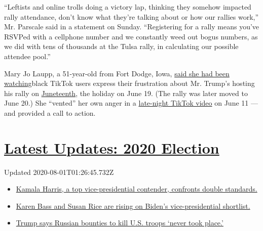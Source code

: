 ``Leftists and online trolls doing a victory lap, thinking they somehow
impacted rally attendance, don't know what they're talking about or how
our rallies work,'' Mr. Parscale said in a statement on Sunday.
``Registering for a rally means you've RSVPed with a cellphone number
and we constantly weed out bogus numbers, as we did with tens of
thousands at the Tulsa rally, in calculating our possible attendee
pool.''

Mary Jo Laupp, a 51-year-old from Fort Dodge, Iowa,
\href{https://www.dailydot.com/debug/tiktok-challenge-trump-rally/}{said
she had been watching}black TikTok users express their frustration about
Mr. Trump's hosting his rally on
\href{https://www.nytimes3xbfgragh.onion/interactive/2020/06/18/style/juneteenth-celebration.html}{Juneteenth},
the holiday on June 19. (The rally was later moved to June 20.) She
``vented'' her own anger in a
\href{https://www.tiktok.com/@maryjolaupp/video/6837311838640803078}{late-night
TikTok video} on June 11 --- and provided a call to action.

\hypertarget{latest-updates-2020-election}{%
\section{\texorpdfstring{\href{https://www.nytimes3xbfgragh.onion/2020/07/31/us/elections/biden-vs-trump.html?action=click\&pgtype=Article\&state=default\&region=MAIN_CONTENT_1\&context=storylines_live_updates}{Latest
Updates: 2020
Election}}{Latest Updates: 2020 Election}}\label{latest-updates-2020-election}}

Updated 2020-08-01T01:26:45.732Z

\begin{itemize}
\tightlist
\item
  \href{https://www.nytimes3xbfgragh.onion/2020/07/31/us/elections/biden-vs-trump.html?action=click\&pgtype=Article\&state=default\&region=MAIN_CONTENT_1\&context=storylines_live_updates\#link-29fdff45}{Kamala
  Harris, a top vice-presidential contender, confronts double
  standards.}
\item
  \href{https://www.nytimes3xbfgragh.onion/2020/07/31/us/elections/biden-vs-trump.html?action=click\&pgtype=Article\&state=default\&region=MAIN_CONTENT_1\&context=storylines_live_updates\#link-13ec3d9c}{Karen
  Bass and Susan Rice are rising on Biden's vice-presidential
  shortlist.}
\item
  \href{https://www.nytimes3xbfgragh.onion/2020/07/31/us/elections/biden-vs-trump.html?action=click\&pgtype=Article\&state=default\&region=MAIN_CONTENT_1\&context=storylines_live_updates\#link-49e9a016}{Trump
  says Russian bounties to kill U.S. troops `never took place.'}
\end{itemize}

